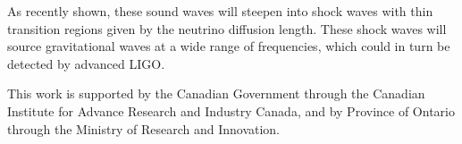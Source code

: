 \documentclass[aps,showpacs,twocolumn,floats,prd,superscriptaddress,nofootinbib]{revtex4}
\begin{document}
As recently shown\cite{2015arXiv151002985P}, these sound waves will
steepen into shock waves with thin transition regions given by the
neutrino diffusion length.  These shock waves will source
gravitational waves at a wide range of frequencies, which could in
turn be detected by advanced LIGO.


\acknowledgments


This work is supported by the Canadian Government through the Canadian
Institute for Advance Research and Industry Canada, and by Province of
Ontario through the Ministry of Research and Innovation.

\appendix

%

\end{document}
